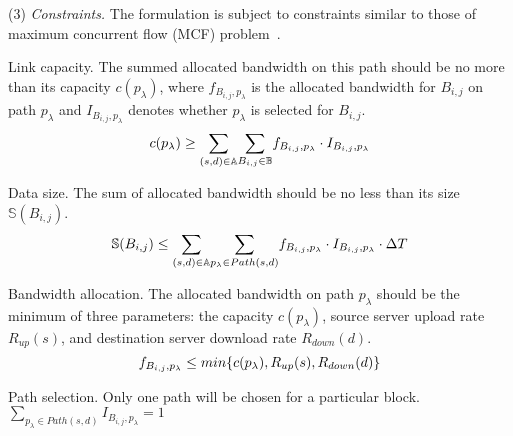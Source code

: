 \noindent(3) {\em Constraints.}
The formulation is subject to constraints similar to those of maximum concurrent flow (MCF) problem~\cite{garg2007faster,reed2012traffic}.%

\begin{packeditemize}
\item Link capacity. The summed allocated bandwidth on this path should be no more than its capacity $c(p_\lambda)$, where $f_{B_{i,j},p_\lambda}$ is the allocated bandwidth for $B_{i,j}$ on path $p_\lambda$ and $I_{B_{i,j},p_\lambda}$ denotes whether $p_\lambda$ is selected for $B_{i,j}$.
\begin{equation}
c(p_\lambda) \geq  \displaystyle{\sum_{(s,d)\in \mathbb{A}}} \displaystyle{\sum_{B_{i,j} \in \mathbb{B}}} f_{B_{i,j},p_\lambda} \cdot I_{B_{i,j},p_\lambda}\\
\end{equation}

\item Data size. The sum of allocated bandwidth should be no less than its size $\mathbb{S}(B_{i,j})$.
\begin{equation}
\mathbb{S}(B_{i,j}) \leq  \displaystyle{\sum_{(s,d)\in \mathbb{A}}} \displaystyle{\sum_{p_{\lambda}\in Path(s,d)}} f_{B_{i,j},p_\lambda} \cdot I_{B_{i,j},p_\lambda} \cdot \Delta T\\
\end{equation}

\item Bandwidth allocation. The allocated bandwidth on path $p_\lambda$ should be the minimum of three parameters: the capacity $c(p_\lambda)$, source server upload rate $R_{up}(s)$, and destination server download rate $R_{down}(d)$.
\begin{equation}
f_{B_{i,j},p_\lambda} \leq  min \{c(p_\lambda),R_{up}(s),R_{down}(d)\}\\
\end{equation}

\item Path selection. Only one path will be chosen for a particular block.
$\displaystyle{\sum_{p_\lambda \in Path(s,d)}} I_{B_{i,j},p_\lambda} = 1$
\end{packeditemize}

